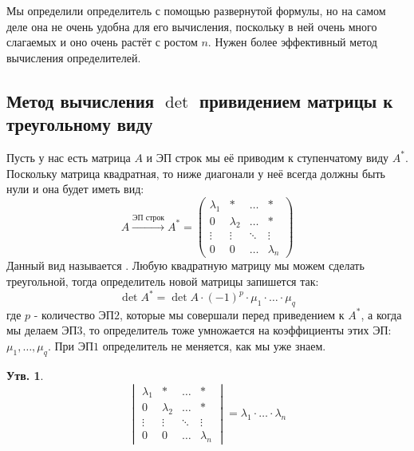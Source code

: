 \documentclass[12pt]{article}
\theoremstyle{definition}
\newtheorem{prop}{Утв.}
\begin{document}
Мы определили определитель с помощью развернутой формулы, но на самом деле она не очень удобна для его вычисления, поскольку в ней очень много слагаемых и оно очень растёт с ростом $n$. Нужен более эффективный метод вычисления определителей.

\subsection*{Метод вычисления $\det$ привидением матрицы к треугольному виду}

Пусть у нас есть матрица $A$ и ЭП строк мы её приводим к ступенчатому виду $A^*$. Поскольку матрица квадратная, то ниже диагонали у неё всегда должны быть нули и она будет иметь вид:
$$
	A \xrightarrow{\text{ЭП строк}} A^* = 
	\begin{pmatrix}
		\lambda_1 & * & \dotsc & * \\
		0 & \lambda_2 &  \dotsc & *\\
		\vdots & \vdots & \ddots & \vdots\\
		0 & 0 & \dotsc & \lambda_n
	\end{pmatrix}
$$
Данный вид называется . Любую квадратную матрицу мы можем сделать треугольной, тогда определитель новой матрицы запишется так:
$$
	\det{A^*} = \det{A}{\cdot}(-1)^p{\cdot}\mu_1{\cdot}\dotsc{\cdot}\mu_q
$$
где $p$ - количество ЭП$2$, которые мы совершали перед приведением к $A^*$, а когда мы делаем ЭП$3$, то определитель тоже умножается на коэффициенты этих ЭП: $\mu_1, \dotsc,\mu_q$. При ЭП$1$ определитель не меняется, как мы уже знаем.
\begin{prop}
	$$
		\begin{vmatrix}
			\lambda_1 & * & \dotsc & * \\
			0 & \lambda_2 &  \dotsc & *\\
			\vdots & \vdots & \ddots & \vdots\\
			0 & 0 & \dotsc & \lambda_n
		\end{vmatrix} = \lambda_1{\cdot}\dotsc{\cdot}\lambda_n
	$$
\end{prop}
\end{document}
